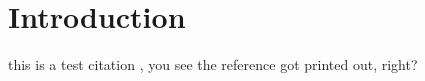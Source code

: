 \newpage

\section{Introduction}

this is a test citation \cite{oreo}, you see the reference got printed out, right?